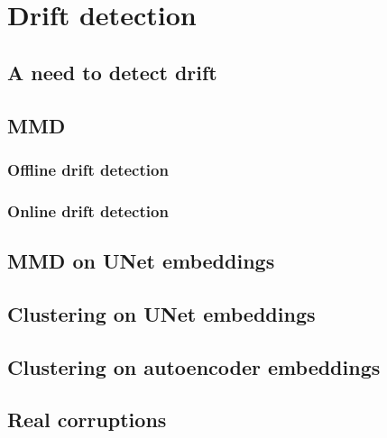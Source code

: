 \section{Drift detection}
    \subsection{A need to detect drift}
    \subsection{MMD}
        \subsubsection{Offline drift detection}
        \subsubsection{Online drift detection}
    \subsection{MMD on UNet embeddings}
    \subsection{Clustering on UNet embeddings}
    \subsection{Clustering on autoencoder embeddings}
    \subsection{Real corruptions}
